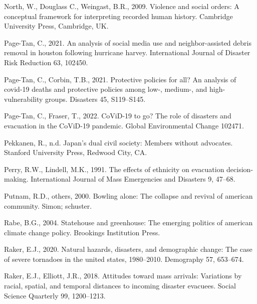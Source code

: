 \documentclass[]{elsarticle} %
\newlength{\cslhangindent}
\newlength{\cslentryspacingunit} %
\newenvironment{CSLReferences}[2] %
 {%
  \setlength{\parindent}{0pt}
  \ifodd #1
  \let\oldpar\par
  \def\par{\hangindent=\cslhangindent\oldpar}
  \fi
  \setlength{\parskip}{#2\cslentryspacingunit}
 }%
 {}
\begin{document}
\begin{CSLReferences}{1}{0}
\leavevmode{}%
North, W., Douglass C., Weingast, B.R., 2009. Violence and social
orders: A conceptual framework for interpreting recorded human history.
Cambridge University Press, Cambridge, UK.

\leavevmode{}%
Page-Tan, C., 2021. An analysis of social media use and
neighbor-assisted debris removal in houston following hurricane harvey.
International Journal of Disaster Risk Reduction 63, 102450.

\leavevmode{}%
Page-Tan, C., Corbin, T.B., 2021. Protective policies for all? An
analysis of covid-19 deaths and protective policies among low-, medium-,
and high-vulnerability groups. Disasters 45, S119--S145.

\leavevmode{}%
Page-Tan, C., Fraser, T., 2022. CoViD-19 to go? The role of disasters
and evacuation in the CoViD-19 pandemic. Global Environmental Change
102471.

\leavevmode{}%
Pekkanen, R., n.d. Japan's dual civil society: Members without
advocates. Stanford University Press, Redwood City, CA.

\leavevmode{}%
Perry, R.W., Lindell, M.K., 1991. The effects of ethnicity on evacuation
decision-making. International Journal of Mass Emergencies and Disasters
9, 47--68.

\leavevmode{}%
Putnam, R.D., others, 2000. Bowling alone: The collapse and revival of
american community. Simon; schuster.

\leavevmode{}%
Rabe, B.G., 2004. Statehouse and greenhouse: The emerging politics of
american climate change policy. Brookings Institution Press.

\leavevmode{}%
Raker, E.J., 2020. Natural hazards, disasters, and demographic change:
The case of severe tornadoes in the united states, 1980--2010.
Demography 57, 653--674.

\leavevmode{}%
Raker, E.J., Elliott, J.R., 2018. Attitudes toward mass arrivals:
Variations by racial, spatial, and temporal distances to incoming
disaster evacuees. Social Science Quarterly 99, 1200--1213.


\end{CSLReferences}
\end{document}
